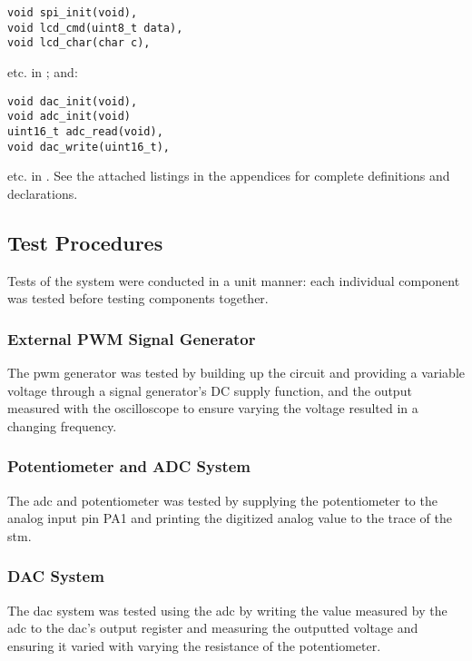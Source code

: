 \begin{lstlisting}[numbers=none]
void spi_init(void),
void lcd_cmd(uint8_t data),
void lcd_char(char c),
\end{lstlisting}

etc. in ; and:

\begin{lstlisting}[numbers=none]
void dac_init(void),
void adc_init(void)
uint16_t adc_read(void),
void dac_write(uint16_t),
\end{lstlisting}

etc. in . See the attached listings in the
appendices for complete definitions and declarations.





\subsection{Test Procedures}
Tests of the system were conducted in a unit manner: each individual
component was tested before testing components together.

\subsubsection{External PWM Signal Generator}
The \gls{pwm} generator was tested by building up the circuit and
providing a variable voltage through a signal generator's DC supply
function, and the output measured with the oscilloscope to ensure
varying the voltage resulted in a changing frequency.

\subsubsection{Potentiometer and ADC System}
The \gls{adc} and potentiometer was tested by supplying the
potentiometer to the analog input pin PA1 and printing the digitized
analog value to the trace of the \gls{stm}.

\subsubsection{DAC System}
The \gls{dac} system was tested using the \gls{adc} by writing the value
measured by the \gls{adc} to the \gls{dac}'s output register and
measuring the outputted voltage and ensuring it varied with varying
the resistance of the potentiometer.

